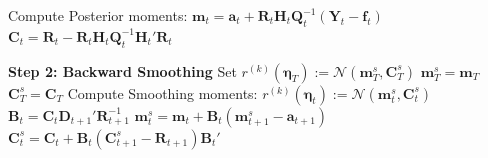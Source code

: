 \documentclass[APA,STIX1COL]{WileyNJD-v2}
\begin{document}
\begin{algorithm}
\begin{algorithmic}
    \State Compute Posterior moments:
    \State $\mathbf{m}_t = \mathbf{a}_t + \mathbf{R}_t \mathbf{H}_t \mathbf{Q}_t^{-1}(\mathbf{Y}_t - \mathbf{f}_t)$
    \State $\mathbf{C}_t = \mathbf{R}_t - \mathbf{R}_t \mathbf{H}_t \mathbf{Q}_t^{-1} \mathbf{H}_t' \mathbf{R}_t$
\EndFor

\State \textbf{Step 2: Backward Smoothing}
        \State Set $r^{(k)}(\boldsymbol{\eta}_T) := \mathcal{N}(\mathbf{m}_T^s, \mathbf{C}_T^s)$
        \State $\mathbf{m}_T^s = \mathbf{m}_T$
        \State $\mathbf{C}_T^s = \mathbf{C}_T$
    \Else
        \State Compute Smoothing moments:
        \State $r^{(k)}(\boldsymbol{\eta}_t) := \mathcal{N}(\mathbf{m}_t^s, \mathbf{C}_t^s)$
        \State $\mathbf{B}_t = \mathbf{C}_t \mathbf{D}_{t+1}' \mathbf{R}_{t+1}^{-1}$
        \State $\mathbf{m}_t^s = \mathbf{m}_t + \mathbf{B}_t (\mathbf{m}_{t+1}^s - \mathbf{a}_{t+1})$
        \State $\mathbf{C}_t^s = \mathbf{C}_t + \mathbf{B}_t (\mathbf{C}_{t+1}^s - \mathbf{R}_{t+1}) \mathbf{B}_t'$
    \EndIf
\EndFor


\end{algorithmic}
\end{algorithm}






\end{document}
